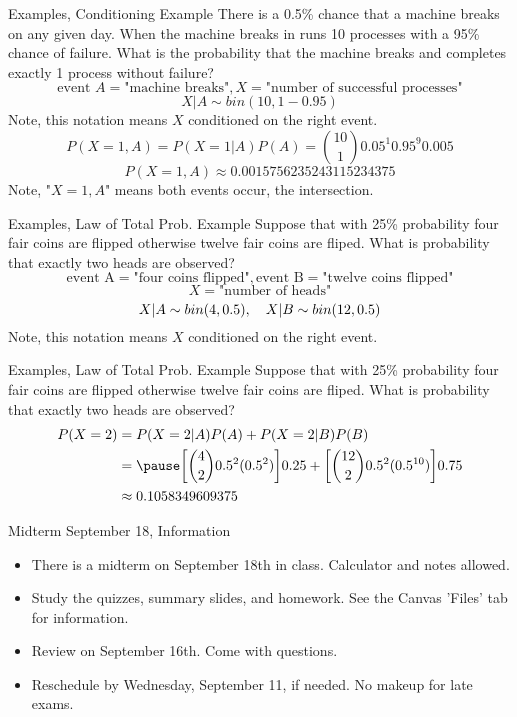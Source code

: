 \documentclass[handout]{beamer}
\newcommand{\nl}[1]{\vspace{#1 em}}
\begin{document}
    \begin{frame}{Examples, Conditioning Example}
        There is a 0.5\% chance that a machine breaks on any given day. When the machine breaks in runs 10 processes with a 95\% chance of failure. What is the probability that the machine breaks and completes exactly 1 process without failure?
        \\ \nl{0.5}
        \pause $$ \text{event } A = \text{"machine breaks"},  X = \text{"number of successful processes"}$$
        \pause
        $$X|A \sim bin(10, 1-0.95)$$
        Note, this notation means $X$ conditioned on the right event.
        \pause $$ P(X=1, A) = P(X=1|A)P(A)  = \binom{10}{1} 0.05^1 0.95^9 0.005 $$
        $$ P(X=1, A) \approx 0.0015756235243115234375 $$
        Note, "$X=1, A$" means both events occur, the intersection.
    \end{frame}
    \begin{frame}{Examples, Law of Total Prob. Example}
        Suppose that with 25\% probability four fair coins are flipped otherwise twelve fair coins are fliped. What is probability that exactly two heads are observed?
        \\ \nl{0.5}
        \pause $$ \text{event A} = \text{"four coins flipped"},  \text{event B} = \text{"twelve coins flipped"}$$
        $$X = \text{"number of heads"} $$
        \pause $$X|A \sim bin(4,0.5), \hskip 1em X|B \sim bin(12,0.5)$$
        Note, this notation means $X$ conditioned on the right event.
    \end{frame}
    \begin{frame}{Examples, Law of Total Prob. Example}
        Suppose that with 25\% probability four fair coins are flipped otherwise twelve fair coins are fliped. What is probability that exactly two heads are observed?
        \\ \nl{0.5}
        \begin{align*}
            P(X=2) & = P(X=2|A)P(A) + P(X=2|B)P(B) \\
            & = \pause \bigg[ \binom{4}{2}0.5^2(0.5^2) \bigg]0.25 + \bigg[ \binom{12}{2}0.5^2(0.5^{10}) \bigg]0.75 \\
            & \approx 0.1058349609375 \\
        \end{align*}
    \end{frame}
    \begin{frame}{Midterm September 18, Information}
        \begin{itemize}
            \item There is a midterm on September 18th in class. Calculator and notes allowed.
            \item Study the quizzes, summary slides, and homework. See the Canvas 'Files' tab for information.
            \item Review on September 16th. Come with questions.
            \item Reschedule by Wednesday, September 11, if needed. No makeup for late exams.
        \end{itemize}
    \end{frame}
\end{document}
